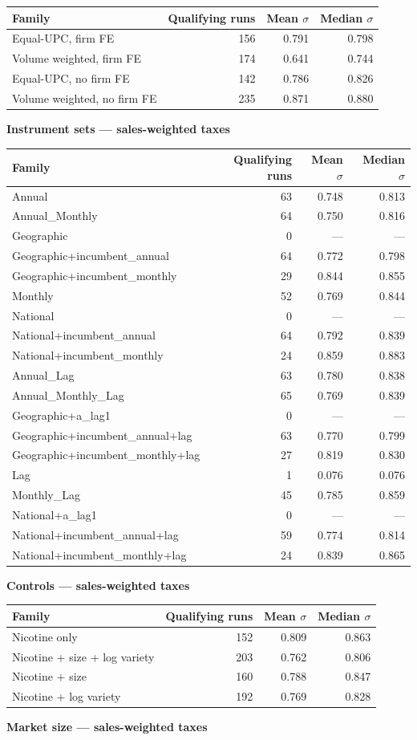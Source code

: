\documentclass[10pt,]{article}
\begin{document}
\begin{longtable}[]{@{}lrrr@{}}
\toprule
Family & Qualifying runs & Mean \(\sigma\) & Median
\(\sigma\)\tabularnewline
\midrule
\endhead
Equal-UPC, firm FE & 156 & 0.791 & 0.798\tabularnewline
Volume weighted, firm FE & 174 & 0.641 & 0.744\tabularnewline
Equal-UPC, no firm FE & 142 & 0.786 & 0.826\tabularnewline
Volume weighted, no firm FE & 235 & 0.871 & 0.880\tabularnewline
\bottomrule
\end{longtable}

\textbf{Instrument sets --- sales-weighted taxes}

\begin{longtable}[]{@{}lrrr@{}}
\toprule
Family & Qualifying runs & Mean \(\sigma\) & Median
\(\sigma\)\tabularnewline
\midrule
\endhead
Annual & 63 & 0.748 & 0.813\tabularnewline
Annual\_Monthly & 64 & 0.750 & 0.816\tabularnewline
Geographic & 0 & --- & ---\tabularnewline
Geographic+incumbent\_annual & 64 & 0.772 & 0.798\tabularnewline
Geographic+incumbent\_monthly & 29 & 0.844 & 0.855\tabularnewline
Monthly & 52 & 0.769 & 0.844\tabularnewline
National & 0 & --- & ---\tabularnewline
National+incumbent\_annual & 64 & 0.792 & 0.839\tabularnewline
National+incumbent\_monthly & 24 & 0.859 & 0.883\tabularnewline
Annual\_Lag & 63 & 0.780 & 0.838\tabularnewline
Annual\_Monthly\_Lag & 65 & 0.769 & 0.839\tabularnewline
Geographic+a\_lag1 & 0 & --- & ---\tabularnewline
Geographic+incumbent\_annual+lag & 63 & 0.770 & 0.799\tabularnewline
Geographic+incumbent\_monthly+lag & 27 & 0.819 & 0.830\tabularnewline
Lag & 1 & 0.076 & 0.076\tabularnewline
Monthly\_Lag & 45 & 0.785 & 0.859\tabularnewline
National+a\_lag1 & 0 & --- & ---\tabularnewline
National+incumbent\_annual+lag & 59 & 0.774 & 0.814\tabularnewline
National+incumbent\_monthly+lag & 24 & 0.839 & 0.865\tabularnewline
\bottomrule
\end{longtable}

\textbf{Controls --- sales-weighted taxes}

\begin{longtable}[]{@{}lrrr@{}}
\toprule
Family & Qualifying runs & Mean \(\sigma\) & Median
\(\sigma\)\tabularnewline
\midrule
\endhead
Nicotine only & 152 & 0.809 & 0.863\tabularnewline
Nicotine + size + log variety & 203 & 0.762 & 0.806\tabularnewline
Nicotine + size & 160 & 0.788 & 0.847\tabularnewline
Nicotine + log variety & 192 & 0.769 & 0.828\tabularnewline
\bottomrule
\end{longtable}

\textbf{Market size --- sales-weighted taxes}
\end{document}
